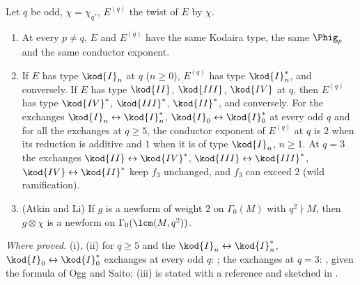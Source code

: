 \begin{sloppypar}
\begin{lemma}\label{lem:paper:twist}
Let $q$ be odd, $\chi=\chi_{q^*}$, $E^{(q)}$ the twist of $E$ by $\chi$.
\begin{enumerate}[label=(\roman*)]
\item At every $p\ne q$, $E$ and $E^{(q)}$ have the same Kodaira type, the same $\Phig_p$ and the same conductor exponent.
\item If $E$ has type $\kod{I}_n$ at $q$ ($n\ge0$), $E^{(q)}$ has type $\kod{I}_n^*$, and conversely. If $E$ has type $\kod{II}$, $\kod{III}$, $\kod{IV}$ at $q$, then $E^{(q)}$ has type $\kod{IV}^*$,
$\kod{III}^*$, $\kod{II}^*$, and conversely. For the exchanges
$\kod{I}_n\leftrightarrow\kod{I}_n^*$, $\kod{I}_0\leftrightarrow\kod{I}_0^*$ at every odd $q$ and for all the exchanges at $q\ge5$, the conductor exponent of $E^{(q)}$ at $q$ is $2$ when its reduction is
additive and $1$ when it is of type $\kod{I}_n$, $n\ge1$. At $q=3$ the exchanges $\kod{II}\leftrightarrow\kod{IV}^*$, $\kod{III}\leftrightarrow\kod{III}^*$, $\kod{IV}\leftrightarrow\kod{II}^*$ keep $f_3$
unchanged, and $f_3$ can exceed $2$ (wild ramification).
\item (Atkin and Li) If $g$ is a newform of weight $2$ on $\Gamma_0(M)$ with $q^2\nmid M$, then $g\otimes\chi$ is a newform on $\Gamma_0(\lcm(M,q^2))$.
\end{enumerate}
\end{lemma}

\noindent\emph{Where proved.} (i), (ii) for $q\ge5$ and the $\kod{I}_n\leftrightarrow\kod{I}_n^*$, $\kod{I}_0\leftrightarrow\kod{I}_0^*$ exchanges at every odd $q$: ; the exchanges at $q=3$:
, given the formula of Ogg and Saito; (iii) is stated with a reference \cite[Theorem 3.1]{AtkinLi78} and sketched in .


\end{sloppypar}
